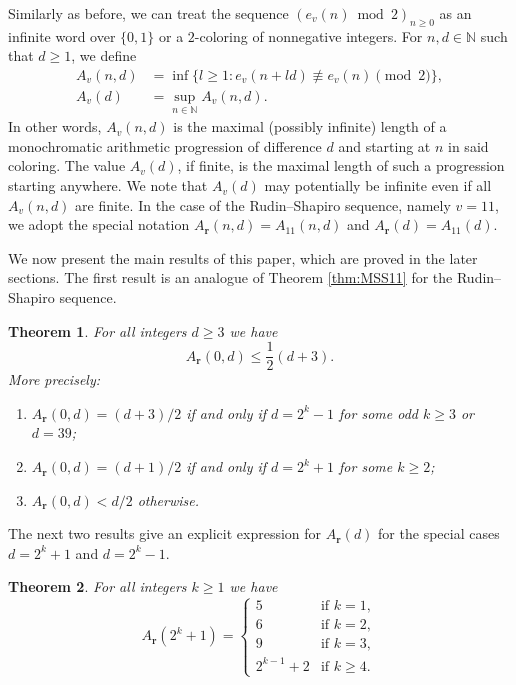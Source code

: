 \documentclass[a4paper,11pt]{amsart}
\newtheorem{thm}{Theorem}[section]
\theoremstyle{definition}
\newcommand{\N}{\mathbb{N}}
\begin{document}
Similarly as before, we can treat the sequence $(e_v(n) \bmod{2})_{n \geq 0}$ as an infinite word over $\{0,1\}$ or a $2$-coloring of nonnegative integers. For $n,d \in \N$ such that $d \geq 1$, we define
\begin{align*}
 A_v(n,d) &= \inf\{l \geq 1: e_v(n + ld) \not\equiv e_v(n) \pmod{2} \}, \\
 A_v(d) &= \sup_{n \in \N} A_v(n,d).
\end{align*}
In other words, $A_v(n,d)$ is the maximal (possibly infinite) length of a monochromatic arithmetic progression of difference $d$ and starting at $n$ in said coloring. The value $A_v(d)$, if finite, is the maximal length of such a progression starting anywhere. We note that $A_v(d)$ may potentially be infinite even if all $A_v(n,d)$ are finite.
In the case of the Rudin--Shapiro sequence, namely $v=11$, we adopt the special notation $A_{\mathbf{r}}(n,d) = A_{11}(n,d)$ and $A_{\mathbf{r}}(d) = A_{11}(d)$. 

We now present the main results of this paper, which are proved in the later sections.
The first result is an analogue of Theorem \ref{thm:MSS11} for the Rudin--Shapiro sequence.

\begin{thm} \label{thm:main1}
For all integers $d \geq 3$ we have
$$  A_{\mathbf{r}}(0,d) \leq \frac{1}{2}(d+3).   $$
More precisely:
\begin{enumerate}[label={\textup{(\roman*)}}]
\item $A_{\mathbf{r}}(0,d) = (d+3)/2$ if and only if $d = 2^k-1$ for some odd $k \geq 3$ or $d=39$;
\item $A_{\mathbf{r}}(0,d) = (d+1)/2$ if and only if $d = 2^k+1$ for some $k \geq 2$;
\item $A_{\mathbf{r}}(0,d) < d/2$ otherwise.
\end{enumerate}
\end{thm}
 
The next two results give an explicit expression for $A_{\mathbf{r}}(d)$ for the special cases $d = 2^k+1$ and $d = 2^k-1$.

\begin{thm} \label{thm:main2}
For all integers $k \geq 1$ we have
$$
A_{\mathbf{r}}(2^k+1) = \begin{cases}
5 &\text{if } k=1, \\
6 &\text{if } k=2, \\
9 &\text{if } k=3, \\
2^{k-1} + 2 &\text{if } k \geq 4.
\end{cases}
$$ 
\end{thm}
\end{document}
